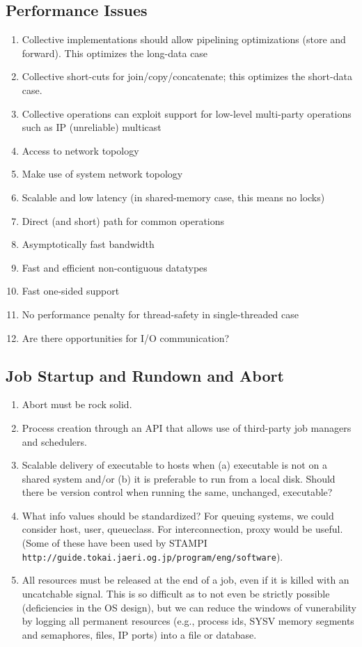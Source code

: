 \documentclass{article}
\def\URL#1{\texttt{#1}}
\begin{document}
\subsection{Performance Issues}
\begin{enumerate}
\item Collective implementations should allow pipelining optimizations (store
  and forward).  This optimizes the long-data case
\item Collective short-cuts for join/copy/concatenate; this optimizes the
  short-data case.
\item Collective operations can exploit support for low-level multi-party
  operations such as IP (unreliable) multicast
\item Access to network topology
\item Make use of system network topology
\item Scalable and low latency (in shared-memory case, this means no locks)
\item Direct (and short) path for common operations
\item Asymptotically fast bandwidth
\item Fast and efficient non-contiguous datatypes
\item Fast one-sided support
\item No performance penalty for thread-safety in single-threaded case
\item Are there opportunities for I/O communication?
\end{enumerate}

\subsection{Job Startup and Rundown and Abort}
\begin{enumerate}
\item Abort must be rock solid.
\item Process creation through an API that allows use of third-party job
  managers and schedulers.
\item Scalable delivery of executable to hosts when (a) executable is not on a
  shared system and/or (b) it is preferable to run from a local disk.  Should
  there be version   control when running the same, unchanged, executable?
\item What info values should be standardized?  For queuing systems, we could
  consider host, user, queueclass.  For interconnection, proxy would be
  useful.  (Some of these have been used by STAMPI
  \URL{http://guide.tokai.jaeri.og.jp/program/eng/software}).
\item All resources must be released at the end of a job, even if it is killed
  with an uncatchable signal.  This is so difficult as to not even be strictly
  possible (deficiencies in the OS design), but we can reduce the windows of
  vunerability by logging all permanent resources (e.g., process ids, SYSV
  memory segments and semaphores, files, IP ports) into a file or database.
\end{enumerate}
\end{document}
